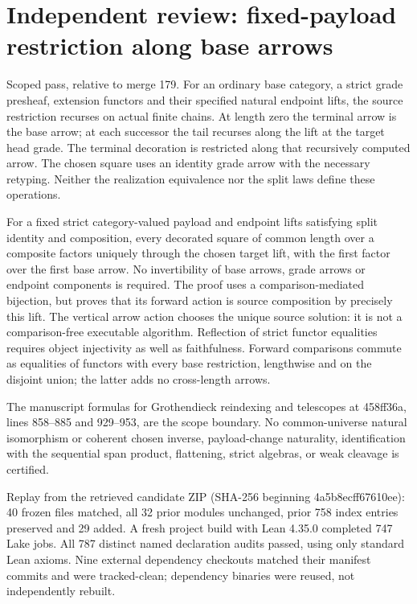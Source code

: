 \documentclass{article}
\begin{document}
\section*{Independent review: fixed-payload restriction along base arrows}
Scoped pass, relative to merge 179. For an ordinary base category, a strict grade presheaf, extension functors and their specified natural endpoint lifts, the source restriction recurses on actual finite chains. At length zero the terminal arrow is the base arrow; at each successor the tail recurses along the lift at the target head grade. The terminal decoration is restricted along that recursively computed arrow. The chosen square uses an identity grade arrow with the necessary retyping. Neither the realization equivalence nor the split laws define these operations.
\par For a fixed strict category-valued payload and endpoint lifts satisfying split identity and composition, every decorated square of common length over a composite factors uniquely through the chosen target lift, with the first factor over the first base arrow. No invertibility of base arrows, grade arrows or endpoint components is required. The proof uses a comparison-mediated bijection, but proves that its forward action is source composition by precisely this lift. The vertical arrow action chooses the unique source solution: it is not a comparison-free executable algorithm. Reflection of strict functor equalities requires object injectivity as well as faithfulness. Forward comparisons commute as equalities of functors with every base restriction, lengthwise and on the disjoint union; the latter adds no cross-length arrows.
\par The manuscript formulas for Grothendieck reindexing and telescopes at 458ff36a, lines 858--885 and 929--953, are the scope boundary. No common-universe natural isomorphism or coherent chosen inverse, payload-change naturality, identification with the sequential span product, flattening, strict algebras, or weak cleavage is certified.
\par Replay from the retrieved candidate ZIP (SHA-256 beginning 4a5b8ecff67610ee): 40 frozen files matched, all 32 prior modules unchanged, prior 758 index entries preserved and 29 added. A fresh project build with Lean 4.35.0 completed 747 Lake jobs. All 787 distinct named declaration audits passed, using only standard Lean axioms. Nine external dependency checkouts matched their manifest commits and were tracked-clean; dependency binaries were reused, not independently rebuilt.
\end{document}
